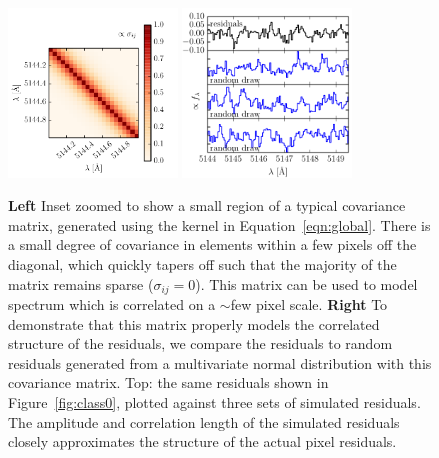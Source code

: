 \documentclass[preprint]{aastex} %
\begin{document}
\begin{figure}[!htb]
\begin{center}
\includegraphics[width=0.4\textwidth]{figs/matern_matrix.pdf}
\includegraphics[width=0.4\textwidth]{figs/matern_draw.pdf}
\caption{\textbf{Left} Inset zoomed to show a small region of a typical covariance matrix, generated using the kernel in Equation~\ref{eqn:global}. There is a small degree of covariance in elements within a few pixels off the diagonal, which quickly tapers off such that the majority of the matrix remains sparse ($\sigma_{ij} = 0$). This matrix can be used to model spectrum which is correlated on a $\sim$few pixel scale.
\textbf{Right} To demonstrate that this matrix properly models the correlated structure of the residuals, we compare the residuals to random residuals generated from a multivariate normal distribution with this covariance matrix. Top: the same residuals shown in Figure~\ref{fig:class0}, plotted against three sets of simulated residuals. The amplitude and correlation length of the simulated residuals closely approximates the structure of the actual pixel residuals.}
\label{fig:matern}
\end{center}
\end{figure}
\end{document}
